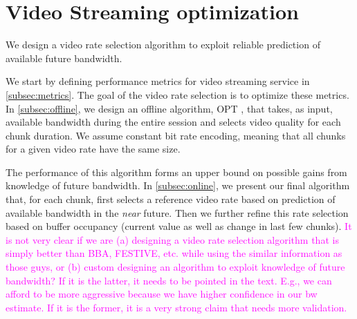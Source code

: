 \newcommand{\rks}[1]{\textcolor{magenta}{#1}}
\section{Video Streaming optimization}\label{sec:optimization}

We design a video rate selection algorithm to exploit reliable
prediction of available future bandwidth.


We start by defining performance metrics for video streaming service in
\autoref{subsec:metrics}. The goal of the video rate selection is to 
optimize these metrics.
In \autoref{subsec:offline}, we design an offline algorithm, OPT , that
takes, as input, available bandwidth during the entire session and
selects video quality for each chunk duration. We assume constant bit
rate encoding, meaning that all chunks for a given video rate have the
same size.

  
The performance of this algorithm forms an upper bound on possible
gains from knowledge of future bandwidth.
In \autoref{subsec:online}, we present our final algorithm that, for
each chunk, first selects a reference video rate  based on prediction of 
available bandwidth in the \emph{near} future. 
Then we further refine this rate selection based on buffer occupancy
(current value as well as change in last few chunks).
%
\rks{It is not very clear if we are (a) designing a video rate
  selection algorithm that is simply better than BBA, FESTIVE,
  etc. while using the similar information as those guys,
  or (b) custom designing an algorithm to exploit knowledge of future
  bandwidth? If it is the latter, it needs to be pointed in the
  text. E.g., we can afford to be more aggressive because we have
  higher confidence in our bw estimate. If it is the former, it is a
  very strong claim that needs more validation.}

